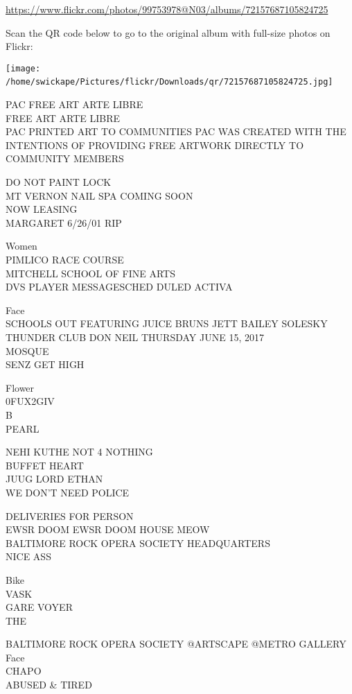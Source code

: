 \documentclass[10pt,letterpaper]{article}
\begin{document}
\url{https://www.flickr.com/photos/99753978@N03/albums/72157687105824725}

Scan the QR code below to go to the original album with full-size photos on Flickr:

\texttt{[image: /home/swickape/Pictures/flickr/Downloads/qr/72157687105824725.jpg]}
\

PAC FREE ART ARTE LIBRE\\
FREE ART ARTE LIBRE\\
PAC PRINTED ART TO COMMUNITIES PAC WAS CREATED WITH THE INTENTIONS OF PROVIDING FREE ARTWORK DIRECTLY TO COMMUNITY MEMBERS

DO NOT PAINT LOCK\\
MT VERNON NAIL SPA COMING SOON\\
NOW LEASING\\
MARGARET 6/26/01 RIP

Women\\
PIMLICO RACE COURSE\\
MITCHELL SCHOOL OF FINE ARTS\\
DVS PLAYER MESSAGESCHED DULED ACTIVA

Face\\
SCHOOLS OUT FEATURING JUICE BRUNS JETT BAILEY SOLESKY THUNDER CLUB DON NEIL THURSDAY JUNE 15, 2017\\
MOSQUE\\
SENZ GET HIGH

Flower\\
0FUX2GIV\\
B\\
PEARL

NEHI KUTHE NOT 4 NOTHING\\
BUFFET HEART\\
JUUG LORD ETHAN\\
WE DON'T NEED POLICE

DELIVERIES FOR PERSON\\
EWSR DOOM EWSR DOOM HOUSE MEOW\\
BALTIMORE ROCK OPERA SOCIETY HEADQUARTERS\\
NICE ASS

Bike\\
VASK\\
GARE VOYER\\
THE

BALTIMORE ROCK OPERA SOCIETY @ARTSCAPE @METRO GALLERY\\
Face\\
CHAPO\\
ABUSED \& TIRED
\end{document}
